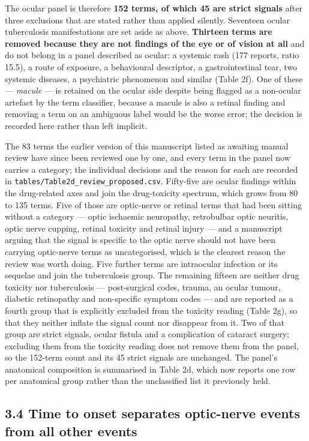\documentclass[utf8]{FrontiersinVancouver}
\begin{document}
The ocular panel is therefore \textbf{152 terms, of which 45 are strict signals} after three exclusions that are stated rather than applied silently. Seventeen ocular tuberculosis manifestations are set aside as above. \textbf{Thirteen terms are removed because they are not findings of the eye or of vision at all} and do not belong in a panel described as ocular: a systemic rash (177 reports, ratio 15.5), a route of exposure, a behavioural descriptor, a gastrointestinal tear, two systemic diseases, a psychiatric phenomenon and similar (Table 2f). One of these --- \textit{macule} --- is retained on the ocular side despite being flagged as a non-ocular artefact by the term classifier, because a macule is also a retinal finding and removing a term on an ambiguous label would be the worse error; the decision is recorded here rather than left implicit.

The 83 terms the earlier version of this manuscript listed as awaiting manual review have since been reviewed one by one, and every term in the panel now carries a category; the individual decisions and the reason for each are recorded in \texttt{tables/Table2d\_review\_proposed.csv}. Fifty-five are ocular findings within the drug-related axes and join the drug-toxicity spectrum, which grows from 80 to 135 terms. Five of those are optic-nerve or retinal terms that had been sitting without a category --- optic ischaemic neuropathy, retrobulbar optic neuritis, optic nerve cupping, retinal toxicity and retinal injury --- and a manuscript arguing that the signal is specific to the optic nerve should not have been carrying optic-nerve terms as uncategorised, which is the clearest reason the review was worth doing. Five further terms are intraocular infection or its sequelae and join the tuberculosis group. The remaining fifteen are neither drug toxicity nor tuberculosis --- post-surgical codes, trauma, an ocular tumour, diabetic retinopathy and non-specific symptom codes --- and are reported as a fourth group that is explicitly excluded from the toxicity reading (Table 2g), so that they neither inflate the signal count nor disappear from it. Two of that group are strict signals, ocular fistula and a complication of cataract surgery; excluding them from the toxicity reading does not remove them from the panel, so the 152-term count and its 45 strict signals are unchanged. The panel's anatomical composition is summarised in Table 2d, which now reports one row per anatomical group rather than the unclassified list it previously held.

\subsection{3.4 Time to onset separates optic-nerve events from all other events}
\end{document}
